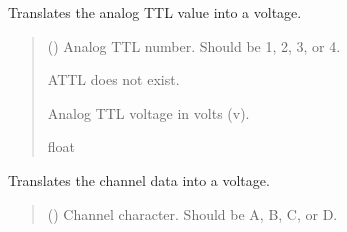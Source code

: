 \documentclass[letterpaper,10pt,english]{sphinxmanual}
\begin{document}
\begin{fulllineitems}
\begin{fulllineitems}
\end{fulllineitems}


\begin{fulllineitems}
\label{\detokenize{PodApi.Packets:PodApi.Packets.Binary5.PacketBinary5.AnalogTTL}}
\pysigstartsignatures
{}
\pysigstopsignatures
\sphinxAtStartPar
Translates the analog TTL value into a voltage.
\begin{quote}\begin{description}
\sphinxAtStartPar
{} () \textendash{} Analog TTL number. Should be 1, 2, 3, or 4.

\sphinxAtStartPar
{} \textendash{} ATTL does not exist.

\sphinxAtStartPar
Analog TTL voltage in volts (v).

\sphinxAtStartPar
float

\end{description}\end{quote}

\end{fulllineitems}


\begin{fulllineitems}
\label{\detokenize{PodApi.Packets:PodApi.Packets.Binary5.PacketBinary5.Channel}}
\pysigstartsignatures
{}
\pysigstopsignatures
\sphinxAtStartPar
Translates the channel data into a voltage.
\begin{quote}\begin{description}
\sphinxAtStartPar
{} () \textendash{} Channel character. Should be A, B, C, or D.


\end{description}
\end{quote}
\end{fulllineitems}
\end{fulllineitems}
\end{document}
